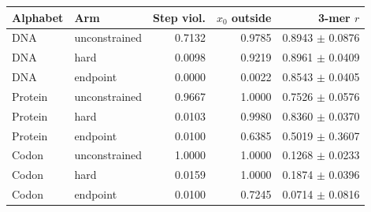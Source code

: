 \begin{tabular}{llrrr}
\toprule
Alphabet & Arm & Step viol. & $x_0$ outside & 3-mer $r$ \\
\midrule
DNA & unconstrained & 0.7132 & 0.9785 & 0.8943 $\pm$ 0.0876 \\
DNA & hard & 0.0098 & 0.9219 & 0.8961 $\pm$ 0.0409 \\
DNA & endpoint & 0.0000 & 0.0022 & 0.8543 $\pm$ 0.0405 \\
\midrule
Protein & unconstrained & 0.9667 & 1.0000 & 0.7526 $\pm$ 0.0576 \\
Protein & hard & 0.0103 & 0.9980 & 0.8360 $\pm$ 0.0370 \\
Protein & endpoint & 0.0100 & 0.6385 & 0.5019 $\pm$ 0.3607 \\
\midrule
Codon & unconstrained & 1.0000 & 1.0000 & 0.1268 $\pm$ 0.0233 \\
Codon & hard & 0.0159 & 1.0000 & 0.1874 $\pm$ 0.0396 \\
Codon & endpoint & 0.0100 & 0.7245 & 0.0714 $\pm$ 0.0816 \\
\bottomrule
\end{tabular}